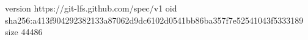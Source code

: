 version https://git-lfs.github.com/spec/v1
oid sha256:a413f904292382133a87062d9dc6102d0541bb86ba357f7e52541043f5333189
size 44486
